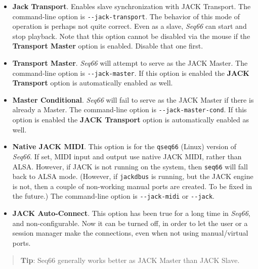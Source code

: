    \begin{itemize}
      \item \textbf{Jack Transport}.
         Enables slave synchronization with JACK Transport.
         The command-line option is \texttt{-{}-jack-transport}.
         The behavior of this mode of operation is perhaps not quite
         correct.  Even as a slave, \textsl{Seq66} can start and
         stop playback.
         Note that this option cannot be disabled via the mouse if the
         \textbf{Transport Master} option is enabled.  Disable that one first.
      \item \textbf{Transport Master}.
         \textsl{Seq66} will attempt to serve as the JACK Master.
         The command-line option is \texttt{-{}-jack-master}.
         If this option is enabled the \textbf{JACK Transport} option is
         automatically enabled as well.
      \item \textbf{Master Conditional}.
         \textsl{Seq66} will fail to serve as the JACK Master if there is
         already a Master.
         The command-line option is \texttt{-{}-jack-master-cond}.
         If this option is enabled the \textbf{JACK Transport} option is
         automatically enabled as well.
      \item \textbf{Native JACK MIDI}.
         This option is for the \texttt{qseq66} (Linux) version of
         \textsl{Seq66}.
         If set, MIDI input and output use native JACK MIDI,
         rather than ALSA.  However, if JACK is not running on the
         system, then \texttt{seq66} will fall back to ALSA mode.
         (However, if \texttt{jackdbus} is running, but the JACK engine is not,
         then a couple of non-working manual ports are created.  To be fixed in
         the future.)
         The command-line option is \texttt{-{}-jack-midi}
         or \texttt{-{}-jack}.
      \item \textbf{JACK Auto-Connect}.
         This option has been true for a long time in \textsl{Seq66}, and
         non-configurable.  Now it can be turned off, in order to let the user
         or a session manager make the connections, even when not using
         manual/virtual ports.
   \end{itemize}

   \begin{quotation}
      \textbf{Tip}:
      Seq66 generally works better as JACK Master than JACK Slave.
   \end{quotation}


